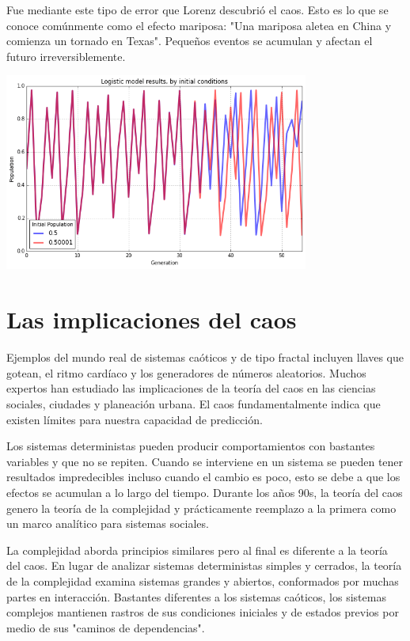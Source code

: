 \documentclass{article} %
\begin{document}
\vspace{0.5 cm}

Fue mediante este tipo de error que Lorenz descubrió el caos. Esto es lo que se conoce comúnmente como el efecto mariposa: "Una mariposa aletea en China y comienza un tornado en Texas". Pequeños eventos se acumulan y afectan el futuro irreversiblemente.

\begin{center}

	\includegraphics[width=10cm]{mariposa.png}
    
\end{center}

\section*{Las implicaciones del caos}

Ejemplos del mundo real de sistemas caóticos y de tipo fractal incluyen llaves que gotean, el ritmo cardíaco y los generadores de números aleatorios. Muchos expertos han estudiado las implicaciones de la teoría del caos en las ciencias sociales, ciudades y planeación urbana. El caos fundamentalmente indica que existen límites para nuestra capacidad de predicción.          

\vspace{0.5 cm}

Los sistemas deterministas pueden producir comportamientos con bastantes variables y que no se repiten. Cuando se interviene en un sistema se pueden tener resultados impredecibles incluso cuando el cambio es poco, esto se debe a que los efectos se acumulan a lo largo del tiempo. Durante los años 90s, la teoría del caos genero la teoría de la complejidad y prácticamente reemplazo a la primera como un marco analítico para sistemas sociales.  

\vspace{0.5 cm}

La complejidad aborda principios similares pero al final es diferente a la teoría del caos. En lugar de analizar sistemas deterministas simples y cerrados, la teoría de la complejidad examina sistemas grandes y abiertos, conformados por muchas partes en interacción. Bastantes diferentes a los sistemas caóticos, los sistemas complejos mantienen rastros de sus condiciones iniciales y de estados previos por medio de sus "caminos de dependencias".
\end{document}
